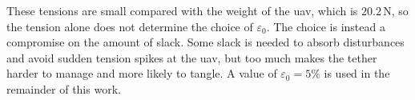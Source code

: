 These tensions are small compared with the weight of the \gls{uav}, which is $20.2\,\text{N}$, so the tension alone does not determine the choice of $\varepsilon_0$. The choice is instead a compromise on the amount of slack. Some slack is needed to absorb disturbances and avoid sudden tension spikes at the \gls{uav}, but too much makes the tether harder to manage and more likely to tangle. A value of $\varepsilon_0 = 5\%$ is used in the remainder of this work.